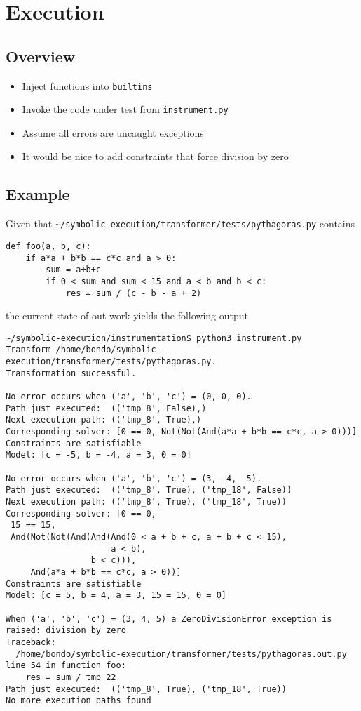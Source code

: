 \documentclass[11pt]{report}
\begin{document}
\section{Execution}

\subsection{Overview}

\begin{itemize}
\item Inject functions into \verb|builtins|
\item Invoke the code under test from \verb|instrument.py|
\item Assume all errors are uncaught exceptions
\item It would be nice to add constraints that force division by zero
\end{itemize}

\subsection{Example}

Given that \verb|~/symbolic-execution/transformer/tests/pythagoras.py| contains
\begin{verbatim}
def foo(a, b, c):
    if a*a + b*b == c*c and a > 0:
        sum = a+b+c
        if 0 < sum and sum < 15 and a < b and b < c:
            res = sum / (c - b - a + 2)
\end{verbatim}

the current state of out work yields the following output

\begin{verbatim}
~/symbolic-execution/instrumentation$ python3 instrument.py
Transform /home/bondo/symbolic-execution/transformer/tests/pythagoras.py.
Transformation successful.

No error occurs when ('a', 'b', 'c') = (0, 0, 0).
Path just executed:  (('tmp_8', False),)
Next execution path: (('tmp_8', True),)
Corresponding solver: [0 == 0, Not(Not(And(a*a + b*b == c*c, a > 0)))]
Constraints are satisfiable
Model: [c = -5, b = -4, a = 3, 0 = 0] 

No error occurs when ('a', 'b', 'c') = (3, -4, -5).
Path just executed:  (('tmp_8', True), ('tmp_18', False))
Next execution path: (('tmp_8', True), ('tmp_18', True))
Corresponding solver: [0 == 0,
 15 == 15,
 And(Not(Not(And(And(And(0 < a + b + c, a + b + c < 15),
                     a < b),
                 b < c))),
     And(a*a + b*b == c*c, a > 0))]
Constraints are satisfiable
Model: [c = 5, b = 4, a = 3, 15 = 15, 0 = 0] 

When ('a', 'b', 'c') = (3, 4, 5) a ZeroDivisionError exception is raised: division by zero
Traceback:
  /home/bondo/symbolic-execution/transformer/tests/pythagoras.out.py line 54 in function foo:
    res = sum / tmp_22
Path just executed:  (('tmp_8', True), ('tmp_18', True))
No more execution paths found
\end{verbatim}
\end{document}
